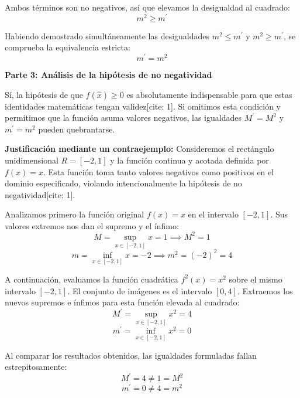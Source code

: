 \documentclass[11pt,letterpaper]{article}
\begin{document}
Ambos términos son no negativos, así que elevamos la desigualdad al cuadrado:
\begin{equation*}
m^{2} \ge m^{\prime}
\end{equation*}

Habiendo demostrado simultáneamente las desigualdades $m^{2} \le m^{\prime}$ y $m^{2} \ge m^{\prime}$, se comprueba la equivalencia estricta:
\begin{equation*}
m^{\prime} = m^{2}
\end{equation*}

\vspace{0.5cm}
\textbf{Parte 3: Análisis de la hipótesis de no negatividad}

Sí, la hipótesis de que $f(\hat{x}) \ge 0$ es absolutamente indispensable para que estas identidades matemáticas tengan validez[cite: 1]. Si omitimos esta condición y permitimos que la función asuma valores negativos, las igualdades $M^{\prime}=M^{2}$ y $m^{\prime}=m^{2}$ pueden quebrantarse.

\textbf{Justificación mediante un contraejemplo:}
Consideremos el rectángulo unidimensional $R = [-2, 1]$ y la función continua y acotada definida por $f(x) = x$. Esta función toma tanto valores negativos como positivos en el dominio especificado, violando intencionalmente la hipótesis de no negatividad[cite: 1].

Analizamos primero la función original $f(x) = x$ en el intervalo $[-2, 1]$. Sus valores extremos nos dan el supremo y el ínfimo:
\begin{equation*}
M = \sup_{x \in [-2, 1]} x = 1 \implies M^{2} = 1
\end{equation*}
\begin{equation*}
m = \inf_{x \in [-2, 1]} x = -2 \implies m^{2} = (-2)^{2} = 4
\end{equation*}

A continuación, evaluamos la función cuadrática $f^{2}(x) = x^{2}$ sobre el mismo intervalo $[-2, 1]$. El conjunto de imágenes es el intervalo $[0, 4]$. Extraemos los nuevos supremos e ínfimos para esta función elevada al cuadrado:
\begin{equation*}
M^{\prime} = \sup_{x \in [-2, 1]} x^{2} = 4
\end{equation*}
\begin{equation*}
m^{\prime} = \inf_{x \in [-2, 1]} x^{2} = 0
\end{equation*}

Al comparar los resultados obtenidos, las igualdades formuladas fallan estrepitosamente:
\begin{equation*}
M^{\prime} = 4 \ne 1 = M^{2}
\end{equation*}
\begin{equation*}
m^{\prime} = 0 \ne 4 = m^{2}
\end{equation*}
\end{document}
